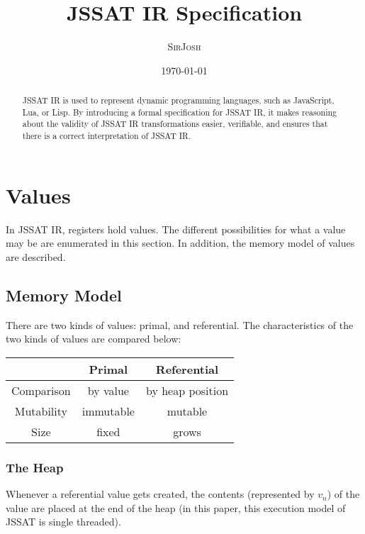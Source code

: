 \documentclass[twocolumn]{article}
\title{JSSAT IR Specification}
\author{\textsc{SirJosh}}
\date{\today}
\begin{document}
\maketitle

\begin{abstract}
  JSSAT IR is used to represent dynamic programming languages, such as JavaScript,
  Lua, or Lisp. By introducing a formal specification for JSSAT IR, it makes reasoning
  about the validity of JSSAT IR transformations easier, verifiable, and ensures
  that there is a correct interpretation of JSSAT IR.
\end{abstract}

\section{Values}

In JSSAT IR, registers hold values. The different possibilities for what a value
may be are enumerated in this section. In addition, the memory model of values are
described.

\subsection{Memory Model}

There are two kinds of values: primal, and referential. The characteristics of the
two kinds of values are compared below:

\begin{center}
  \begin{tabular}{ |c|c|c| }
    \hline
               & Primal    & Referential      \\
    \hline
    Comparison & by value  & by heap position \\
    \hline
    Mutability & immutable & mutable          \\
    \hline
    Size       & fixed     & grows            \\
    \hline
  \end{tabular}
\end{center}

\subsubsection{The Heap}

Whenever a referential value gets created, the contents (represented by $v_n$) of
the value are placed at the end of the heap (in this paper, this execution model
of JSSAT is single threaded).
\end{document}
